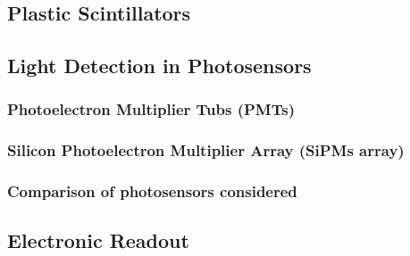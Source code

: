 \documentclass[12pt,a4paper]{book}
\begin{document}
		\subsection{Plastic Scintillators} \label{subsec:PlasticScintillators}
		
		
			
		\subsection{Light Detection in Photosensors}\label{subsec:Photosensors}
		
	
			\subsubsection{Photoelectron Multiplier Tubs (PMTs)}\label{subsubsec:PMTs}
			
		
			\subsubsection{Silicon Photoelectron Multiplier Array (SiPMs array)}\label{subsubsec:SiPM}
			
			
			\subsubsection[Comparison Photosensors]{Comparison of photosensors considered}\label{subsubsec:ComparisonPhotosensors}
			
					
		\subsection{Electronic Readout}\label{subsec:IntroductionElectronicalSystem}
			
	
\end{document}
